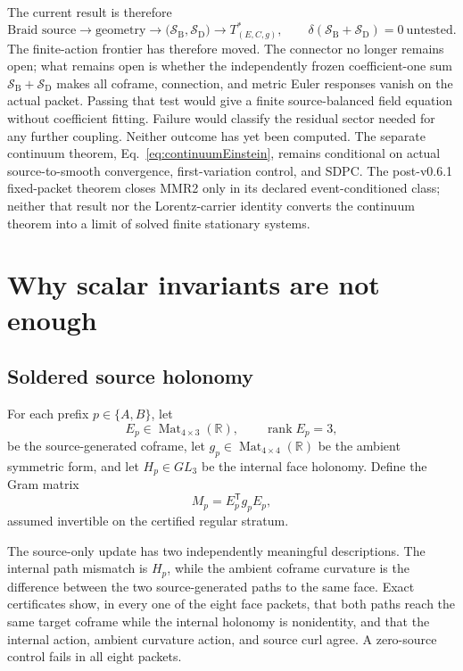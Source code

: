 \documentclass[11pt]{article}
\theoremstyle{definition}
\theoremstyle{remark}
\newcommand{\rank}{\operatorname{rank}}
\begin{document}
The current result is therefore
\begin{equation}\label{eq:frontier}
 \boxed{
 \text{Braid source}\to\text{geometry}
 \to\bigl(\mathcal S_{\mathrm B},\mathcal S_{\mathrm D}\bigr)
 \to T^*_{(E,C,g)},
 \qquad
 \delta\!\left(\mathcal S_{\mathrm B}+\mathcal S_{\mathrm D}\right)=0
 \ \text{untested}.}
\end{equation}
The finite-action frontier has therefore moved. The connector no longer remains open; what remains open is whether the independently frozen coefficient-one sum $\mathcal S_{\mathrm B}+\mathcal S_{\mathrm D}$ makes all coframe, connection, and metric Euler responses vanish on the actual packet. Passing that test would give a finite source-balanced field equation without coefficient fitting. Failure would classify the residual sector needed for any further coupling. Neither outcome has yet been computed. The separate continuum theorem, Eq.~\eqref{eq:continuumEinstein}, remains conditional on actual source-to-smooth convergence, first-variation control, and SDPC. The post-v0.6.1 fixed-packet theorem closes MMR2 only in its declared event-conditioned class; neither that result nor the Lorentz-carrier identity converts the continuum theorem into a limit of solved finite stationary systems.

\section{Why scalar invariants are not enough}

\subsection{Soldered source holonomy}

For each prefix $p\in\{A,B\}$, let
\[
 E_p\in\operatorname{Mat}_{4\times3}(\mathbb R),\qquad
 \rank E_p=3,
\]
be the source-generated coframe, let $g_p\in\operatorname{Mat}_{4\times4}(\mathbb R)$ be the ambient symmetric form, and let $H_p\in GL_3$ be the internal face holonomy. Define the Gram matrix
\begin{equation}\label{eq:gram}
 M_p=E_p^{\mathsf T}g_pE_p,
\end{equation}
assumed invertible on the certified regular stratum.

The source-only update has two independently meaningful descriptions. The internal path mismatch is $H_p$, while the ambient coframe curvature is the difference between the two source-generated paths to the same face. Exact certificates show, in every one of the eight face packets, that both paths reach the same target coframe while the internal holonomy is nonidentity, and that the internal action, ambient curvature action, and source curl agree. A zero-source control fails in all eight packets.
\end{document}
